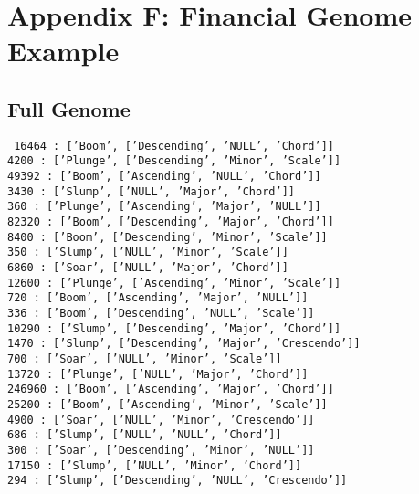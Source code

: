 \section{Appendix F: Financial Genome Example}
\label{sec:genomeappend}
\subsection*{Full Genome}
\texttt{
16464   :  ['Boom', ['Descending', 'NULL', 'Chord']]\\
4200    :  ['Plunge', ['Descending', 'Minor', 'Scale']]\\
49392   :  ['Boom', ['Ascending', 'NULL', 'Chord']]\\
3430    :  ['Slump', ['NULL', 'Major', 'Chord']]\\
360     :  ['Plunge', ['Ascending', 'Major', 'NULL']]\\
82320   :  ['Boom', ['Descending', 'Major', 'Chord']]\\
8400    :  ['Boom', ['Descending', 'Minor', 'Scale']]\\
350     :  ['Slump', ['NULL', 'Minor', 'Scale']]\\
6860    :  ['Soar', ['NULL', 'Major', 'Chord']]\\
12600   :  ['Plunge', ['Ascending', 'Minor', 'Scale']]\\
720     :  ['Boom', ['Ascending', 'Major', 'NULL']]\\
336     :  ['Boom', ['Descending', 'NULL', 'Scale']]\\
10290   :  ['Slump', ['Descending', 'Major', 'Chord']]\\
1470    :  ['Slump', ['Descending', 'Major', 'Crescendo']]\\
700     :  ['Soar', ['NULL', 'Minor', 'Scale']]\\
13720   :  ['Plunge', ['NULL', 'Major', 'Chord']]\\
246960  :  ['Boom', ['Ascending', 'Major', 'Chord']]\\
25200   :  ['Boom', ['Ascending', 'Minor', 'Scale']]\\
4900    :  ['Soar', ['NULL', 'Minor', 'Crescendo']]\\
686     :  ['Slump', ['NULL', 'NULL', 'Chord']]\\
300     :  ['Soar', ['Descending', 'Minor', 'NULL']]\\
17150   :  ['Slump', ['NULL', 'Minor', 'Chord']]\\
294     :  ['Slump', ['Descending', 'NULL', 'Crescendo']]\\
}
